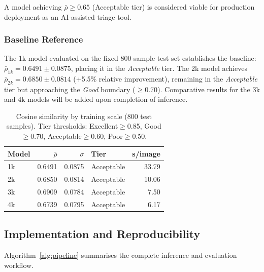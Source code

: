 \documentclass[twocolumn]{article}
\begin{document}
A model achieving $\bar{\rho} \geq 0.65$ (Acceptable tier) is considered
viable for production deployment as an AI-assisted triage tool.

\subsubsection{Baseline Reference}

The 1k model evaluated on the fixed 800-sample test set establishes the
baseline: $\bar{\rho}_{1k} = 0.6491 \pm 0.0875$, placing it in the
\textit{Acceptable} tier.
The 2k model achieves $\bar{\rho}_{2k} = 0.6850 \pm 0.0814$
(+5.5\% relative improvement), remaining in the \textit{Acceptable} tier
but approaching the \textit{Good} boundary ($\geq 0.70$).
Comparative results for the 3k and 4k models will be added upon
completion of inference.

\begin{table}[h]
\centering
\caption{Cosine similarity by training scale (800 test samples).
         Tier thresholds: Excellent$\geq$0.85, Good$\geq$0.70,
         Acceptable$\geq$0.60, Poor$\geq$0.50.}
\label{tab:results}
\setlength{\tabcolsep}{5pt}
\begin{tabular}{lrrlr}
\toprule
Model & $\bar{\rho}$ & $\sigma$ & Tier & s/image \\
\midrule
1k & 0.6491 & 0.0875 & Acceptable & 33.79 \\
2k & 0.6850 & 0.0814 & Acceptable & 10.06 \\
3k & 0.6909 & 0.0784 & Acceptable & 7.50 \\
4k & 0.6739 & 0.0795 & Acceptable & 6.17 \\
\bottomrule
\end{tabular}
\end{table}

\subsection{Implementation and Reproducibility}
\label{sec:implementation}

Algorithm~\ref{alg:pipeline} summarises the complete inference and evaluation
workflow.
\end{document}
